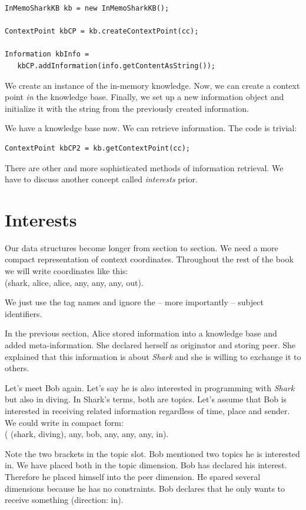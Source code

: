 \begin{verbatim}
InMemoSharkKB kb = new InMemoSharkKB();

ContextPoint kbCP = kb.createContextPoint(cc);

Information kbInfo = 
   kbCP.addInformation(info.getContentAsString());
\end{verbatim}

We create an instance of the in-memory knowledge. Now, we can create a context point {\it in} the knowledge base. Finally, we set up a new information object and initialize it with the string from the previously created information.

We have a knowledge base now. We can retrieve information. The code is trivial:

\begin{verbatim}
ContextPoint kbCP2 = kb.getContextPoint(cc);
\end{verbatim}

There are other and more sophisticated methods of information retrieval. We have to discuss another concept called {\it interests} prior.

\section{Interests}
Our data structures become longer from section to section. We need a more compact representation of context coordinates. Throughout the rest of the book we will write coordinates like this:\\
(shark, alice, alice, any, any, any, out). 

We just use the tag names and ignore the -- more importantly -- subject identifiers.

In the previous section, Alice stored information into a knowledge base and added meta-information. She declared herself as originator and storing peer. She explained that this information is about {\it Shark} and she is willing to exchange it to others.

Let's meet Bob again. Let's say he is also interested in programming with {\it Shark} but also in diving. In Shark's terms, both are topics. Let's assume that Bob is interested in receiving related information regardless of time, place and sender. We could write in compact form:\\
( (shark, diving), any, bob, any, any, any, in). 

Note the two brackets in the topic slot. Bob mentioned two topics he is interested in. We have placed both in the topic dimension. Bob has declared his interest. Therefore he placed himself into the peer dimension. He spared several dimensions because he has no constraints. Bob declares that he only wants to receive something (direction: in).

